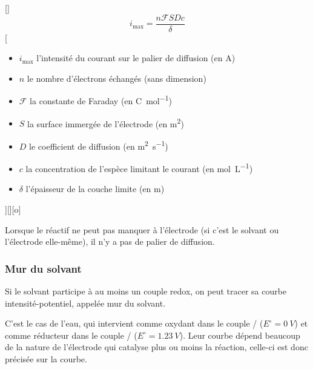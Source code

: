[]
{$$i_\text{max}=\frac{n\mathcal{F}SDc}{\delta}$$}
[
    \begin{itemize}
        \item $i_\text{max}$ l'intensité du courant sur le palier de diffusion (en \unit{A})
        \item $n$ le nombre d'électrons échangés (sans dimension)
        \item $\mathcal{F}$ la constante de Faraday (en \unit{C.mol^{-1}})
        \item $S$ la surface immergée de l'électrode (en \unit{m^2})
        \item $D$ le coefficient de diffusion (en \unit{m^2.s^{-1}})
        \item $c$ la concentration de l'espèce limitant le courant (en \unit{mol.L^{-1}})
        \item $\delta$ l'épaisseur de la couche limite (en \unit{m})
    \end{itemize}
][][o]


Lorsque le réactif ne peut pas manquer à l'électrode (si c'est le solvant ou l'électrode elle-même), il n'y a pas de palier de diffusion.


\subsubsection{Mur du solvant}
Si le solvant participe à au moins un couple redox, on peut tracer sa courbe intensité-potentiel, appelée mur du solvant.

C'est le cas de l'eau, qui intervient comme oxydant dans le couple / ($E^\circ=\SI{0}{V}$) et comme réducteur dans le couple / ($E^\circ=\SI{1.23}{V}$). Leur courbe dépend beaucoup de la nature de l'électrode qui catalyse plus ou moins la réaction, celle-ci est donc précisée sur la courbe.


